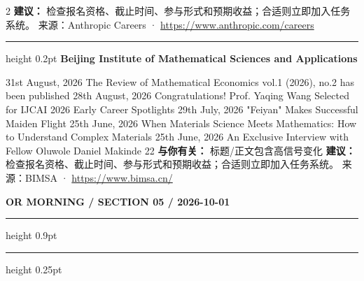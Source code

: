 \documentclass[10.5pt]{ctexart}
\begin{document}
\begin{multicols}{2}
\textbf{建议：} 检查报名资格、截止时间、参与形式和预期收益；合适则立即加入任务系统。
{\footnotesize\color{ormuted} 来源：Anthropic Careers · \url{https://www.anthropic.com/careers}}
\vspace{2mm}
\hrule height 0.2pt
\vspace{2mm}
{\large\bfseries Beijing Institute of Mathematical Sciences and Applications}\par
31st August, 2026 The Review of Mathematical Economics vol.1 (2026), no.2 has been published 28th August, 2026 Congratulations! Prof. Yaqing Wang Selected for IJCAI 2026 Early Career Spotlights 29th July, 2026 "Feiyan" Makes Successful Maiden Flight 25th June, 2026 When Materials Science Meets Mathematics: How to Understand Complex Materials 25th June, 2026 An Exclusive Interview with Fellow Oluwole Daniel Makinde 22
\textbf{与你有关：} 标题/正文包含高信号变化
\textbf{建议：} 检查报名资格、截止时间、参与形式和预期收益；合适则立即加入任务系统。
{\footnotesize\color{ormuted} 来源：BIMSA · \url{https://www.bimsa.cn/}}
\end{multicols}
\newpage
{\small\bfseries OR MORNING / SECTION 05 / 2026-10-01}
\vspace{2mm}
\hrule height 0.9pt
\vspace{1.5mm}
\hrule height 0.25pt
\vspace{4mm}
\end{document}
